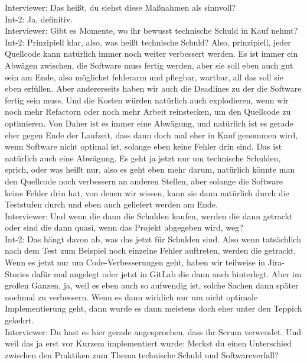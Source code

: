 Interviewer: Das heißt, du siehst diese Maßnahmen als sinnvoll?\\
Int-2: Ja, definitiv. \\
Interviewer: Gibt es Momente, wo ihr bewusst technische Schuld in Kauf nehmt? \\
Int-2: Prinzipiell klar, also, was heißt technische Schuld? Also, prinzipiell, jeder Quellcode kann natürlich immer noch weiter verbessert werden. Es ist immer ein Abwägen zwischen, die Software muss fertig werden, aber sie soll eben auch gut sein am Ende, also möglichst fehlerarm und pflegbar, wartbar, all das soll sie eben erfüllen. Aber andererseits haben wir auch die Deadlines zu der die Software fertig sein muss. Und die Kosten würden natürlich auch explodieren, wenn wir noch mehr Refactorn oder noch mehr Arbeit reinstecken, um den Quellcode zu optimieren. Von Daher ist es immer eine Abwägung, und natürlich ist es gerade eher gegen Ende der Laufzeit, dass dann doch mal eher in Kauf genommen wird, wenn Software nicht optimal ist, solange eben keine Fehler drin sind. Das ist natürlich auch eine Abwägung. Es geht ja jetzt nur um technische Schulden, sprich, oder was heißt nur, also es geht eben mehr darum, natürlich könnte man den Quellcode noch verbessern an anderen Stellen, aber solange die Software keine Fehler drin hat, von denen wir wissen, kann sie dann natürlich durch die Teststufen durch und eben auch geliefert werden am Ende. \\
Interviewer: Und wenn die dann die Schulden kaufen, werden die dann getrackt oder sind die dann quasi, wenn das Projekt abgegeben wird, weg? \\
Int-2: Das hängt davon ab, was das jetzt für Schulden sind. Also wenn tatsächlich nach dem Test zum Beispiel noch einzelne Fehler auftreten, werden die getrackt. Wenn es jetzt nur um Code-Verbesserungen geht, haben wir teilweise in Jira-Stories dafür mal angelegt oder jetzt in GitLab die dann auch hinterlegt. Aber im großen Ganzen, ja, weil es eben auch so aufwendig ist, solche Sachen dann später nochmal zu verbessern. Wenn es dann wirklich nur um nicht optimale Implementierung geht, dann wurde es dann meistens doch eher unter den Teppich gekehrt. \\
Interviewer: Du hast es hier gerade angesprochen, dass ihr Scrum verwendet. Und weil das ja erst vor Kurzem implementiert wurde: Merkst du einen Unterschied zwischen den Praktiken zum Thema technische Schuld und Softwareverfall?\\
